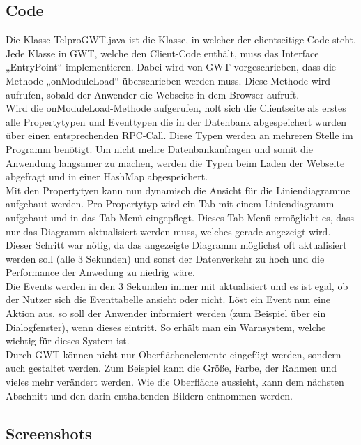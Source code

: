 \documentclass[12pt,a4paper,twoside]{article}
\begin{document}
\subsection{Code}
Die Klasse TelproGWT.java ist die Klasse, in welcher der clientseitige Code steht. Jede Klasse in GWT, welche den Client-Code enthält, muss das Interface „EntryPoint“ implementieren. Dabei wird von GWT vorgeschrieben, dass die Methode „onModuleLoad“ überschrieben werden muss. Diese Methode wird aufrufen, sobald der Anwender die Webseite in dem Browser aufruft.\\
Wird die onModuleLoad-Methode aufgerufen, holt sich die Clientseite als erstes alle Propertytypen und Eventtypen die in der Datenbank abgespeichert wurden über einen entsprechenden RPC-Call. Diese Typen werden an mehreren Stelle im Programm benötigt. Um nicht mehre Datenbankanfragen und somit die Anwendung langsamer zu machen, werden die Typen beim Laden der Webseite abgefragt und in einer HashMap abgespeichert. \\
Mit den Propertytyen kann nun dynamisch die Ansicht für die Liniendiagramme aufgebaut werden. Pro Propertytyp wird ein Tab mit einem Liniendiagramm aufgebaut und in das Tab-Menü eingepflegt. Dieses Tab-Menü ermöglicht es, dass nur das Diagramm aktualisiert werden muss, welches gerade angezeigt wird. Dieser Schritt war nötig, da das angezeigte Diagramm möglichst oft aktualisiert werden soll (alle 3 Sekunden) und sonst der Datenverkehr zu hoch und die Performance der Anwedung zu niedrig wäre.\\
Die Events werden in den 3 Sekunden immer mit aktualisiert und es ist egal, ob der Nutzer sich die Eventtabelle ansieht oder nicht. Löst ein Event nun eine Aktion aus, so soll der Anwender informiert werden (zum Beispiel über ein Dialogfenster), wenn dieses eintritt. So erhält man ein Warnsystem, welche wichtig für dieses System ist.\\
Durch GWT können nicht nur Oberflächenelemente eingefügt werden, sondern auch gestaltet werden. Zum Beispiel kann die Größe, Farbe, der Rahmen und vieles mehr verändert werden. Wie die Oberfläche aussieht, kann dem nächsten Abschnitt und den darin enthaltenden Bildern entnommen werden.

\subsection{Screenshots}
\end{document}
